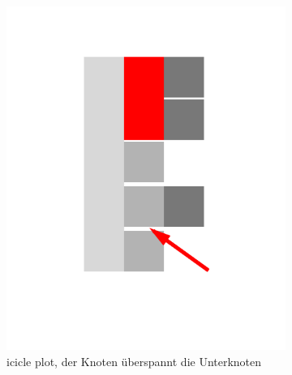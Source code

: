 \documentclass[nobib, nohyper, a4paper,openany]{tufte-book}
\newcommand*{\cb}[1]{\textcolor{RedOrange}{#1}}
\begin{document}
\begin{figure}
\begin{subfigure}[b]{0.3\textwidth}
    \includegraphics[width=\textwidth]{figures/tree_display2.pdf} 
    \caption{ icicle plot, der \cb{Knoten} überspannt die Unterknoten}  
    \label{fig:treesb}   
  \end{subfigure}
  \begin{subfigure}[b]{0.3\textwidth}

\end{subfigure}
\end{figure}
\end{document}
